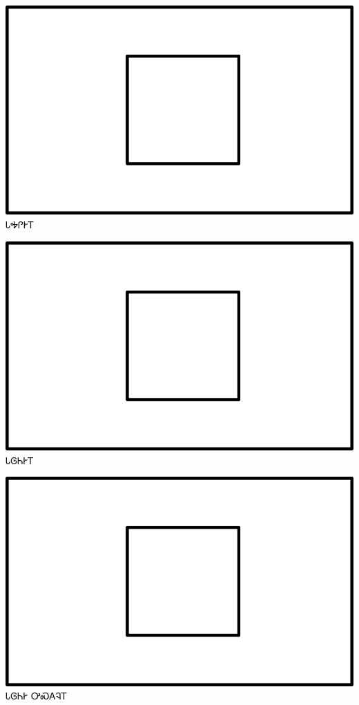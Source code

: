 \documentclass[avery5371]{flashcards}%
\begin{document}
    \begin{flashcard}{
        \includegraphics[width=0.95\columnwidth,height=.51\columnwidth,keepaspectratio]{../artwork/for-colors/square-white}
    }
        \Huge ᏓᎭᎵᎨᎢ
    \end{flashcard}

    \begin{flashcard}{
        \includegraphics[width=0.95\columnwidth,height=.51\columnwidth,keepaspectratio]{../artwork/for-colors/square-white}
    }
        \Huge ᏓᎶᏂᎨᎢ
    \end{flashcard}

    \begin{flashcard}{
        \includegraphics[width=0.95\columnwidth,height=.51\columnwidth,keepaspectratio]{../artwork/for-colors/square-white}
    }
        \Huge ᏓᎶᏂᎨ ᎤᏍᎪᎸᎢ
    \end{flashcard}
\end{document}
